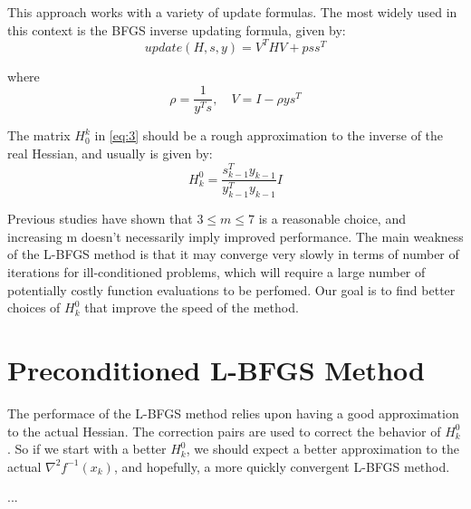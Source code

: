 This approach works with a variety of update formulas. The most widely used in 
this context is the BFGS inverse updating formula, given by:
\begin{equation}
    update(H,s,y) = V^T HV + pss^T
\end{equation}

where
\begin{equation}
    \rho = \frac{1}{y^T s}, \quad V = I - \rho ys^T
\end{equation}

The matrix \( H^{k}_{0} \) in \eqref{eq:3} should be a rough approximation to 
the inverse of the real Hessian, and usually is given by:
\begin{equation}
     H^{0}_{k} = \frac{s^{T}_{k-1} y_{k-1}}{y^{T}_{k-1} y_{k-1}}I 
\end{equation}

Previous studies have shown that \( 3 \leq m \leq 7 \) is a reasonable choice, 
and increasing m doesn't necessarily imply improved performance. The main 
weakness of the L-BFGS method is that it may converge very slowly in terms of 
number of iterations for ill-conditioned problems, which will require a large 
number of potentially costly function evaluations to be perfomed. Our goal 
is to find better choices of \( H^{0}_{k} \) that improve the speed of the 
method.

\section{Preconditioned L-BFGS Method}
The performace of the L-BFGS method relies upon having a good approximation 
to the actual Hessian. The correction pairs are used to correct the behavior 
of \( H^{0}_{k} \). So if we start with a better \( H^{0}_{k} \), we should 
expect a better approximation to the actual \( \nabla^2 f^{-1}(x_k) \), and 
hopefully, a more quickly convergent L-BFGS method.

...